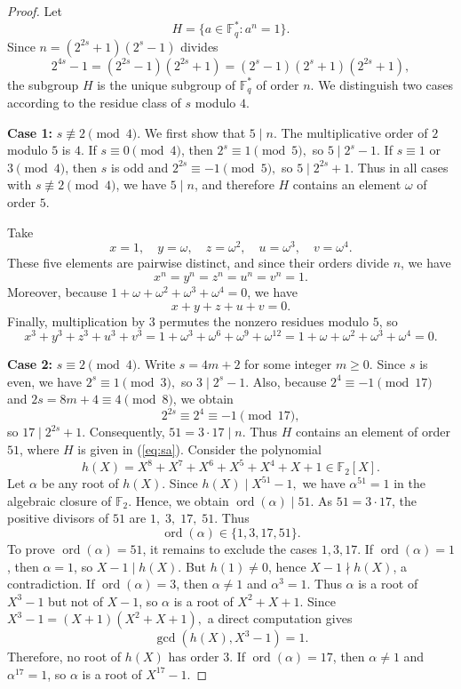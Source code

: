 \documentclass[12pt,draftcls,journal,onecolumn]{IEEEtran}
\begin{document}
\begin{proof}
Let
\begin{equation}\label{eq:sa}
H=\{a\in \mathbb F_q^*: a^n=1\}.
\end{equation}
Since
$
n=(2^{2s}+1)(2^s-1)
$
divides
\[
2^{4s}-1=(2^{2s}-1)(2^{2s}+1)
=(2^s-1)(2^s+1)(2^{2s}+1),
\]
the subgroup \(H\) is the unique subgroup of \(\mathbb F_q^*\) of order \(n\).
We distinguish two cases according to the residue class of \(s\) modulo \(4\).



\noindent
\textbf{Case 1:} $s\not\equiv 2\pmod 4$.
We first show that \(5\mid n\).
The multiplicative order of \(2\) modulo \(5\) is \(4\).
If \(s\equiv 0\pmod 4\), then
$
2^s\equiv 1\pmod 5,
$
so \(5\mid 2^s-1\).
If \(s\equiv 1\) or \(3\pmod 4\), then \(s\) is odd and
$
2^{2s}\equiv -1\pmod 5,
$
so \(5\mid 2^{2s}+1\).
Thus in all cases with \(s\not\equiv 2\pmod 4\), we have \(5\mid n\), and therefore \(H\) contains an element \(\omega\) of order \(5\).


Take
\[
x=1,\quad y=\omega,\quad z=\omega^2,\quad u=\omega^3,\quad v=\omega^4.
\]
These five elements are pairwise distinct, and since their orders divide \(n\), we have
\[
x^n=y^n=z^n=u^n=v^n=1.
\]
Moreover, because \(1+\omega+\omega^2+\omega^3+\omega^4=0\), we have
\[
x+y+z+u+v=0.
\]
Finally, multiplication by \(3\) permutes the nonzero residues modulo \(5\), so
\[
x^3+y^3+z^3+u^3+v^3
=1+\omega^3+\omega^6+\omega^9+\omega^{12}
=1+\omega+\omega^2+\omega^3+\omega^4
=0.
\]

\medskip

\noindent
\textbf{Case 2:} $s\equiv2\pmod4$. Write \(s=4m+2\) for some integer \(m\ge 0\).
Since \(s\) is even, we have
$
2^s\equiv 1\pmod 3,
$
so \(3\mid 2^s-1\).
Also, because \(2^4\equiv -1\pmod{17}\) and \(2s=8m+4\equiv 4\pmod 8\), we obtain
\[
2^{2s}\equiv 2^4\equiv -1\pmod{17},
\]
so \(17\mid 2^{2s}+1\).
Consequently,
$
51=3\cdot 17 \mid n.
$
Thus \(H\) contains an element of order \(51\), where $H$ is given in (\ref{eq:sa}).
Consider the polynomial
\[
h(X)=X^8+X^7+X^6+X^5+X^4+X+1 \in \mathbb F_2[X].
\]
Let \(\alpha\) be any root of \(h(X)\). Since
$
h(X)\mid X^{51}-1,
$
we have \(\alpha^{51}=1\) in the algebraic closure of \(\mathbb F_2\). Hence, we obtain
$
\operatorname{ord}(\alpha)\mid 51.
$
As \(51=3\cdot 17\), the positive divisors of \(51\) are
$
1,\;3,\;17,\;51.
$
Thus
\[
\operatorname{ord}(\alpha)\in\{1,3,17,51\}.
\]
To prove \(\operatorname{ord}(\alpha)=51\), it remains to exclude the cases \(1,3,17\).
If \(\operatorname{ord}(\alpha)=1\), then \(\alpha=1\), so \(X-1\mid h(X)\). But \(h(1)\neq 0\), hence \(X-1\nmid h(X)\), a contradiction.
If \(\operatorname{ord}(\alpha)=3\), then \(\alpha\neq 1\) and \(\alpha^3=1\). Thus \(\alpha\) is a root of \(X^3-1\) but not of \(X-1\), so \(\alpha\) is a root of
$
X^2+X+1.
$
Since
$
X^3-1=(X+1)(X^2+X+1),
$
a direct computation gives
\[
\gcd(h(X),X^3-1)=1.
\]
Therefore, no root of \(h(X)\) has order \(3\).
If \(\operatorname{ord}(\alpha)=17\), then \(\alpha\neq 1\) and \(\alpha^{17}=1\), so \(\alpha\) is a root of
$
X^{17}-1.
$


\end{proof}
\end{document}
